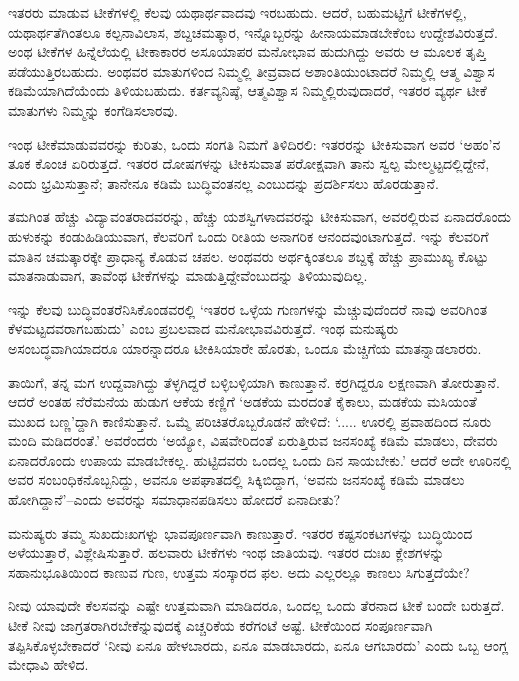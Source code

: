 ಇತರರು ಮಾಡುವ ಟೀಕೆಗಳಲ್ಲಿ ಕೆಲವು ಯಥಾರ್ಥವಾದವು ಇರಬಹುದು. ಆದರೆ, ಬಹುಮಟ್ಟಿಗೆ ಟೀಕೆಗಳಲ್ಲಿ, ಯಥಾರ್ಥತೆಗಿಂತಲೂ ಕಲ್ಪನಾವಿಲಾಸ, ಶಬ್ದಚಮತ್ಕಾರ, ಇನ್ನೊಬ್ಬರನ್ನು ಹೀನಾಯಮಾಡಬೇಕೆಂಬ ಉದ್ದೇಶವಿರುತ್ತದೆ. ಅಂಥ ಟೀಕೆಗಳ ಹಿನ್ನೆಲೆಯಲ್ಲಿ ಟೀಕಾಕಾರರ ಅಸೂಯಾಪರ ಮನೋಭಾವ ಹುದುಗಿದ್ದು ಅವರು ಆ ಮೂಲಕ ತೃಪ್ತಿ ಪಡೆಯುತ್ತಿರಬಹುದು. ಅಂಥವರ ಮಾತುಗಳಿಂದ ನಿಮ್ಮಲ್ಲಿ ತೀವ್ರವಾದ ಅಶಾಂತಿಯುಂಟಾದರೆ ನಿಮ್ಮಲ್ಲಿ ಆತ್ಮ ವಿಶ್ವಾಸ ಕಡಿಮೆಯಾಗಿದೆಯೆಂದು ತಿಳಿಯಬಹುದು. ಕರ್ತವ್ಯನಿಷ್ಠೆ, ಆತ್ಮವಿಶ್ವಾಸ ನಿಮ್ಮಲ್ಲಿರುವುದಾದರೆ, ಇತರರ ವ್ಯರ್ಥ ಟೀಕೆ ಮಾತುಗಳು ನಿಮ್ಮನ್ನು ಕಂಗೆಡಿಸಲಾರವು.

ಇಂಥ ಟೀಕೆಮಾಡುವವರನ್ನು ಕುರಿತು, ಒಂದು ಸಂಗತಿ ನಿಮಗೆ ತಿಳಿದಿರಲಿ: ಇತರರನ್ನು ಟೀಕಿಸುವಾಗ ಅವರ ‘ಅಹಂ’ನ ತೂಕ ಕೊಂಚ ಏರಿರುತ್ತದೆ. ಇತರರ ದೋಷಗಳನ್ನು ಟೀಕಿಸುವಾತ ಪರೋಕ್ಷವಾಗಿ ತಾನು ಸ್ವಲ್ಪ ಮೇಲ್ಮಟ್ಟದಲ್ಲಿದ್ದೇನೆ, ಎಂದು ಭ್ರಮಿಸುತ್ತಾನೆ; ತಾನೇನೂ ಕಡಿಮೆ ಬುದ್ಧಿವಂತನಲ್ಲ ಎಂಬುದನ್ನು ಪ್ರದರ್ಶಿಸಲು ಹೊರಡುತ್ತಾನೆ.

ತಮಗಿಂತ ಹೆಚ್ಚು ವಿದ್ಯಾವಂತರಾದವರನ್ನು, ಹೆಚ್ಚು ಯಶಸ್ವಿಗಳಾದವರನ್ನು ಟೀಕಿಸುವಾಗ, ಅವರಲ್ಲಿರುವ ಏನಾದರೊಂದು ಹುಳುಕನ್ನು ಕಂಡುಹಿಡಿಯುವಾಗ, ಕೆಲವರಿಗೆ ಒಂದು ರೀತಿಯ ಅನಾಗರಿಕ ಆನಂದವುಂಟಾಗುತ್ತದೆ. ಇನ್ನು ಕೆಲವರಿಗೆ ಮಾತಿನ ಚಮತ್ಕಾರಕ್ಕೇ ಪ್ರಾಧಾನ್ಯ ಕೊಡುವ ಚಪಲ. ಅಂಥವರು ಅರ್ಥಕ್ಕಿಂತಲೂ ಶಬ್ದಕ್ಕೆ ಹೆಚ್ಚು ಪ್ರಾಮುಖ್ಯ ಕೊಟ್ಟು ಮಾತನಾಡುವಾಗ, ತಾವೆಂಥ ಟೀಕೆಗಳನ್ನು ಮಾಡುತ್ತಿದ್ದೇವೆಂಬುದನ್ನು ತಿಳಿಯುವುದಿಲ್ಲ.

ಇನ್ನು ಕೆಲವು ಬುದ್ಧಿವಂತರೆನಿಸಿಕೊಂಡವರಲ್ಲಿ ‘ಇತರರ ಒಳ್ಳೆಯ ಗುಣಗಳನ್ನು ಮೆಚ್ಚುವುದೆಂದರೆ ನಾವು ಅವರಿಗಿಂತ ಕೆಳಮಟ್ಟದವರಾಗಬಹುದು’ ಎಂಬ ಪ್ರಬಲವಾದ ಮನೋಭಾವವಿರುತ್ತದೆ. ಇಂಥ ಮನುಷ್ಯರು ಅಸಂಬದ್ಧವಾಗಿಯಾದರೂ ಯಾರನ್ನಾದರೂ ಟೀಕಿಸಿಯಾರೇ ಹೊರತು, ಒಂದೂ ಮೆಚ್ಚಿಗೆಯ ಮಾತನ್ನಾಡಲಾರರು.

ತಾಯಿಗೆ, ತನ್ನ ಮಗ ಉದ್ದವಾಗಿದ್ದು ತೆಳ್ಳಗಿದ್ದರೆ ಬಳ್ಳಿಬಳ್ಳಿಯಾಗಿ ಕಾಣುತ್ತಾನೆ. ಕರ್ರಗಿದ್ದರೂ ಲಕ್ಷಣವಾಗಿ ತೋರುತ್ತಾನೆ. ಆದರೆ ಅಂತಹ ನೆರೆಮನೆಯ ಹುಡುಗ ಆಕೆಯ ಕಣ್ಣಿಗೆ ‘ಅಡಕೆಯ ಮರದಂತೆ ಕೈಕಾಲು, ಮಡಕೆಯ ಮಸಿಯಂತೆ ಮುಖದ ಬಣ್ಣ’ದ್ದಾಗಿ ಕಾಣಿಸುತ್ತಾನೆ. ಒಮ್ಮೆ ಪರಿಚಿತರೊಬ್ಬರೊಡನೆ ಹೇಳಿದೆ: ‘..... ಊರಲ್ಲಿ ಪ್ರವಾಹದಿಂದ ನೂರು ಮಂದಿ ಮಡಿದರಂತೆ.’ ಅವರೆಂದರು ‘ಅಯ್ಯೋ, ವಿಷವೇರಿದಂತೆ ಏರುತ್ತಿರುವ ಜನಸಂಖ್ಯೆ ಕಡಿಮೆ ಮಾಡಲು, ದೇವರು ಏನಾದರೊಂದು ಉಪಾಯ ಮಾಡಬೇಕಲ್ಲ. ಹುಟ್ಟಿದವರು ಒಂದಲ್ಲ ಒಂದು ದಿನ ಸಾಯಬೇಕು.’ ಆದರೆ ಅದೇ ಊರಿನಲ್ಲಿ ಅವರ ಸಂಬಂಧಿಕನೊಬ್ಬನಿದ್ದು, ಅವನೂ ಅಪಘಾತದಲ್ಲಿ ಸಿಕ್ಕಿಬಿದ್ದಾಗ, ‘ಅವನು ಜನಸಂಖ್ಯೆ ಕಡಿಮೆ ಮಾಡಲು ಹೋಗಿದ್ದಾನೆ’–ಎಂದು ಅವರನ್ನು ಸಮಾಧಾನಪಡಿಸಲು ಹೋದರೆ ಏನಾದೀತು?

ಮನುಷ್ಯರು ತಮ್ಮ ಸುಖದುಃಖಗಳ್ನು ಭಾವಪೂರ್ಣವಾಗಿ ಕಾಣುತ್ತಾರೆ. ಇತರರ ಕಷ್ಟಸಂಕಟಗಳನ್ನು ಬುದ್ಧಿಯಿಂದ ಅಳೆಯುತ್ತಾರೆ, ವಿಶ್ಲೇಷಿಸುತ್ತಾರೆ. ಹಲವಾರು ಟೀಕೆಗಳು ಇಂಥ ಜಾತಿಯವು. ಇತರರ ದುಃಖ ಕ್ಲೇಶಗಳನ್ನು ಸಹಾನುಭೂತಿಯಿಂದ ಕಾಣುವ ಗುಣ, ಉತ್ತಮ ಸಂಸ್ಕಾರದ ಫಲ. ಅದು ಎಲ್ಲರಲ್ಲೂ ಕಾಣಲು ಸಿಗುತ್ತದೆಯೇ?

ನೀವು ಯಾವುದೇ ಕೆಲಸವನ್ನು ಎಷ್ಟೇ ಉತ್ತಮವಾಗಿ ಮಾಡಿದರೂ, ಒಂದಲ್ಲ ಒಂದು ತೆರನಾದ ಟೀಕೆ ಬಂದೇ ಬರುತ್ತದೆ. ಟೀಕೆ ನೀವು ಜಾಗ್ರತರಾಗಿರಬೇಕೆನ್ನುವುದಕ್ಕೆ ಎಚ್ಚರಿಕೆಯ ಕರೆಗಂಟೆ ಅಷ್ಟೆ. ಟೀಕೆಯಿಂದ ಸಂಪೂರ್ಣವಾಗಿ ತಪ್ಪಿಸಿಕೊಳ್ಳಬೇಕಾದರೆ ‘ನೀವು ಏನೂ ಹೇಳಬಾರದು, ಏನೂ ಮಾಡಬಾರದು, ಏನೂ ಆಗಬಾರದು’ ಎಂದು ಒಬ್ಬ ಆಂಗ್ಲ ಮೇಧಾವಿ ಹೇಳಿದ.

